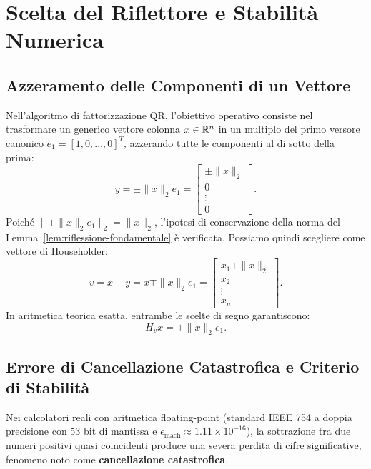 \FloatBarrier
\section{Scelta del Riflettore e Stabilit\`a Numerica}
\label{sec:scelta-riflettore-stabilita}

\subsection{Azzeramento delle Componenti di un Vettore}
Nell'algoritmo di fattorizzazione QR, l'obiettivo operativo consiste nel trasformare un generico vettore colonna $x \in \mathbb{R}^n$ in un multiplo del primo versore canonico $e_1 = [1, 0, \dots, 0]^T$, azzerando tutte le componenti al di sotto della prima:
\begin{equation}
    y = \pm \|x\|_2 e_1 = \begin{bmatrix} \pm \|x\|_2 \\ 0 \\ \vdots \\ 0 \end{bmatrix}.
\end{equation}
Poich\'e $\|\pm \|x\|_2 e_1\|_2 = \|x\|_2$, l'ipotesi di conservazione della norma del Lemma~\ref{lem:riflessione-fondamentale} \`e verificata. Possiamo quindi scegliere come vettore di Householder:
\begin{equation}
    v = x - y = x \mp \|x\|_2 e_1 = \begin{bmatrix} x_1 \mp \|x\|_2 \\ x_2 \\ \vdots \\ x_n \end{bmatrix}.
\end{equation}
In aritmetica teorica esatta, entrambe le scelte di segno garantiscono:
\begin{equation}
    H_v x = \pm \|x\|_2 e_1.
\end{equation}

\subsection{Errore di Cancellazione Catastrofica e Criterio di Stabilit\`a}
Nei calcolatori reali con aritmetica floating-point (standard IEEE 754 a doppia precisione con 53 bit di mantissa e $\epsilon_{\text{mach}} \approx 1.11 \times 10^{-16}$), la sottrazione tra due numeri positivi quasi coincidenti produce una severa perdita di cifre significative, fenomeno noto come \textbf{cancellazione catastrofica}.

